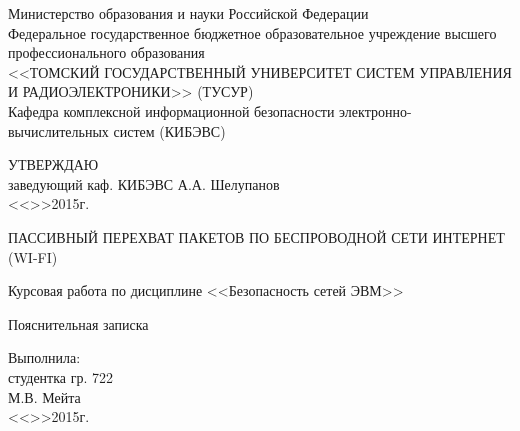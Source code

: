 \newpage
{}

\begin{center}
 Министерство образования и науки Российской Федерации\\
 Федеральное государственное бюджетное образовательное учреждение высшего профессионального образования\\
 <<ТОМСКИЙ ГОСУДАРСТВЕННЫЙ УНИВЕРСИТЕТ СИСТЕМ УПРАВЛЕНИЯ И РАДИОЭЛЕКТРОНИКИ>> (ТУСУР)\\
 Кафедра комплексной информационной безопасности электронно-вычислительных систем (КИБЭВС)\\
\end{center}

\vfill

\begin{flushright}
\begin{minipage}{0.45\textwidth}
 \begin{flushleft}
  УТВЕРЖДАЮ\\
  заведующий каф. КИБЭВС
  \underline{\hspace{3cm}}А.А. Шелупанов \\
  <<\underline{\hspace{1cm}}>>\underline{\hspace{3cm}}2015г.\\
 \end{flushleft}
\end{minipage}
\end{flushright}

\vfill

\begin{center}
ПАССИВНЫЙ ПЕРЕХВАТ ПАКЕТОВ ПО БЕСПРОВОДНОЙ СЕТИ ИНТЕРНЕТ (WI-FI)

Курсовая работа по дисциплине <<Безопасность сетей ЭВМ>>

Пояснительная записка
\end{center}

\vfill
\begin{flushright}
\begin{minipage}{0.45\textwidth}
 \begin{flushleft}
  Выполнила: \\
  студентка гр. 722 \\
  \underline{\hspace{3cm}}М.В. Мейта \\
  <<\underline{\hspace{1cm}}>>\underline{\hspace{3cm}}2015г.\\
 \end{flushleft}
\end{minipage}
\end{flushright}

